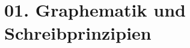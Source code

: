 \documentclass[handout,aspectratio=1610,dvipsnames]{beamer}
\begin{document}
  \section{01. Graphematik und Schreibprinzipien}
  \let\woopsi\section\let\section\subsection\let\subsection\subsubsection
  
  \let\subsection\section\let\section\woopsi
  
\end{document}
